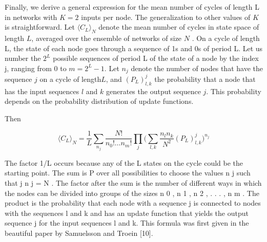 Finally, we derive a general expression for the mean
number of cycles of length L in networks with $K = 2$
inputs per node. The generalization to other values of $K$
is straightforward. Let $\langle C_L\rangle_N$ denote the mean number
of cycles in state space of length $L$, averaged over the
ensemble of networks of size $N$ . On a cycle of length
L, the state of each node goes through a sequence of
1s and 0s of period L. Let us number the $2^L$ possible
sequences of period L of the state of a node by the index
j, ranging from 0 to $m = 2^L − 1$. Let $n_j$ denote the
number of nodes that have the sequence $j$ on a cycle of
length$ L$, and $(P_L )^j_{l,k}$ the probability that a node that
has the input sequences $l$ and $k$ generates the output
sequence $j$. This probability depends on the probability distribution of update functions.



Then

\begin{equation}
\langle C_L\rangle_N = \frac{1}{L} \sum_{n_j} \frac{N!}{n_0! \dots n_m!} \prod_j \big(\sum_{l,k}\frac{n_ln_k}{N^2}(P_L)^j_{l,k}\big)^{n_j}
\end{equation}

The factor 1/L occurs because any of the L states on the
cycle could be the starting point. The sum is P
over all
possibilities to choose the values {n j } such that j n j =
N . The factor after the sum is the number of different
ways in which the nodes can be divided into groups of the
sizes n 0 , n 1 , n 2 , . . . , n m . The product is the probability
that each node with a sequence j is connected to nodes
with the sequences l and k and has an update function
that yields the output sequence j for the input sequences
l and k. This formula was first given in the beautiful
paper by Samuelsson and Troein [10].

